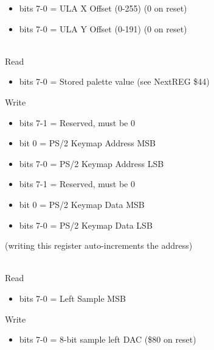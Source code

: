 \begin{itemize}
\item bits 7-0 = ULA X Offset (0-255) (0 on reset)
\end{itemize}

\begin{itemize}
\item bits 7-0 = ULA Y Offset (0-191) (0 on reset)
\end{itemize}

\\
Read
\begin{itemize}
\item bits 7-0 = Stored palette value (see NextREG \$44)
\end{itemize}
Write  
\begin{itemize}
\item bits 7-1 = Reserved, must be 0
\item bit 0 = PS/2 Keymap Address MSB
\end{itemize}

\begin{itemize}
\item bits 7-0 = PS/2 Keymap Address LSB
\end{itemize}

\begin{itemize}
\item bits 7-1 = Reserved, must be 0
\item bit 0 = PS/2 Keymap Data MSB
\end{itemize}

\begin{itemize}
\item bits 7-0 = PS/2 Keymap Data LSB
\end{itemize}
(writing this register auto-increments the address)

\\
Read
\begin{itemize}
\item bits 7-0 = \iis Left Sample MSB
\end{itemize}
Write
\begin{itemize}
\item bits 7-0 = 8-bit sample left DAC (\$80 on reset)
\end{itemize}

